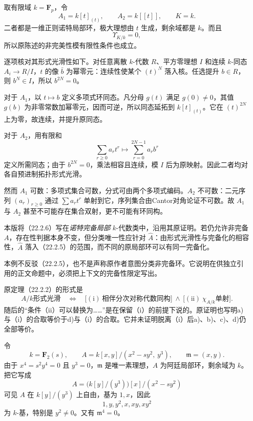 取有限域 $k=\mathbf F_p$，令
\[
 A_1=k[t]_{(t)},\qquad A_2=k[[t]],\qquad K=k.
\]
二者都是一维正则诺特局部环，极大理想由 $t$ 生成，剩余域都是 $k$。而且
\[
 \Upsilon_{K/k}=0,
\]
所以原陈述的非完美性模有限性条件也成立。

逐项核对其形式光滑性如下。对任意离散 $k$-代数 $R$、平方零理想 $I$ 和连续 $k$-同态 $A_i\to R/I$，$t$ 的像 $\bar b$ 为幂零元：连续性使某个 $(t)^N$ 落入核。任选提升 $b\in R$，则 $b^N\in I$，所以 $b^{2N}=0$。

对于 $A_1$，以 $t\mapsto b$ 定义多项式环同态。凡分母 $g(t)$ 满足 $g(0)\ne0$，其值 $g(b)$ 为非零常数加幂零元，因而可逆，所以同态延拓到 $k[t]_{(t)}$。它在 $(t)^{2N}$ 上为零，故连续，并提升原同态。

对于 $A_2$，用有限和
\[
 \sum_{r\ge0}a_rt^r\longmapsto\sum_{r=0}^{2N-1}a_rb^r
\]
定义所需同态；由于 $b^{2N}=0$，乘法相容且连续，模 $I$ 后为原映射。因此二者均对各自预进制拓扑形式光滑。

然而 $A_1$ 可数：多项式集合可数，分式可由两个多项式编码。$A_2$ 不可数：二元序列 $(a_r)_{r\ge0}$ 通过 $\sum a_rt^r$ 单射到它，序列集合由Cantor对角论证不可数。故 $A_1$ 与 $A_2$ 甚至不可能存在集合双射，更不可能有环同构。

本版将（22.2.6）写在\emph{诺特完备局部} $k$-代数类中，沿用其原证明。若仍允许非完备 $A$，存在性判据本身不变，但分类唯一性应针对 $\widehat A$：由形式光滑性与完备化的相容性，$\widehat A$ 落入（22.2.5）的范围，而不同的原局部环可以有同一完备化。

本例不反驳（22.2.5），也不是声称原作者意图分类非完备环。它说明在供独立引用的正文命题中，必须把上下文的完备性限定写出。

原定理（22.2.2）的形式是
\[
 A/k\text{形式光滑}
 \quad\Longleftrightarrow\quad
 \bigl[(\mathrm i)\ \text{相伴分次对称代数同构}\bigr]
 \ \land\
 \bigl[(\mathrm {ii})\ \chi_{A/k}\text{单射}\bigr].
\]
随后的“条件（ii）可以替换为……”是在保留（i）的前提下说的。原证明也写明a)与（i）的合取等价于d)与（i）的合取。它并未证明脱离（i）后a)、b)、c)、d)仍全部等价。

令
\[
 k=\mathbf F_2(s),\qquad
 A=k[x,y]/(x^2-sy^2,\ y^3),\qquad
 \mathfrak m=(x,y).
\]
由于 $x^4=s^2y^4=0$ 且 $y^3=0$，$\mathfrak m$ 是唯一素理想，$A$ 为阿廷局部环，剩余域为 $k$。把它写成
\[
 A=\bigl(k[y]/(y^3)\bigr)[x]/(x^2-sy^2)
\]
可见 $A$ 在 $k[y]/(y^3)$ 上自由，基为 $1,x$，因此
\[
 1,y,y^2,x,xy,xy^2
\]
为 $k$-基，特别是 $y^2\ne0$。又有 $\mathfrak m^4=0$。

